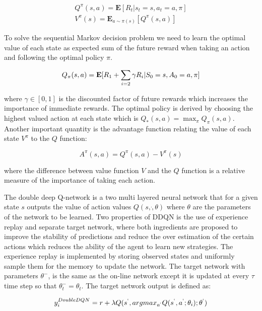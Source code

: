 \documentclass[journal]{IEEEtran}
\begin{document}
\begin{align}
Q^{\pi} (s,a) = \mathbf{E} [R_t |s_t = s, a_t = a, \pi] \\ \nonumber
V^{\pi}(s) = \mathbf{E}_{a \sim \pi(s)} [Q^{\pi}(s,a)]
\end{align}

To solve the sequential Markov decision problem we need to learn the
optimal value of each state as expected sum of the future reward when
taking an action and following the optimal policy \(\pi\).

\begin{equation}
Q_{\pi} (s, a) = \mathbf{E} [R_1 + \sum_{i=2} \gamma R_i | S_0 = s, A_0 = a, \pi] \\
\end{equation}

where \(\gamma \in [0,1]\) is the discounted factor of future rewards
which increases the importance of immediate rewards. The optimal policy
is derived by choosing the highest valued action at each state which is
\(Q_* (s,a) = \max_{\pi} Q_{\pi} (s,a)\). Another important quantity is
the advantage function relating the value of each state \(V^{\pi}\) to
the \(Q\) function:

\begin{equation}
A^{\pi} (s,a) = Q^{\pi} (s,a) - V^{\pi}(s)
\end{equation}

where the difference between value function \(V\) and the \(Q\) function
is a relative measure of the importance of taking each action.

The double deep Q-network is a two multi layered neural network that for a given
state \(s\) outputs the value of action values \(Q(s,\dot, \theta)\)
where \(\theta\) are the parameters of the network to be learned. Two
properties of DDQN is the use of experience replay and separate target
network, where both ingredients are proposed to improve the stability of
predictions and reduce the over estimation of the certain actions which
reduces the ability of the agent to learn new strategies. The experience
replay is implemented by storing observed states and uniformly sample
them for the memory to update the network. The target network with
parameters \(\theta^-\), is the same as the on-line network except it is
updated at every \(\tau\)  time step so that \(\theta^-_t = \theta_t\). The target
network output is defined as:

\begin{align}
y_i^{Double DQN} = r + \lambda Q(s^`, arg max_{a^`} Q(s^`, a^`; \theta_i) ; \theta^`
)
\end{align}
\end{document}
